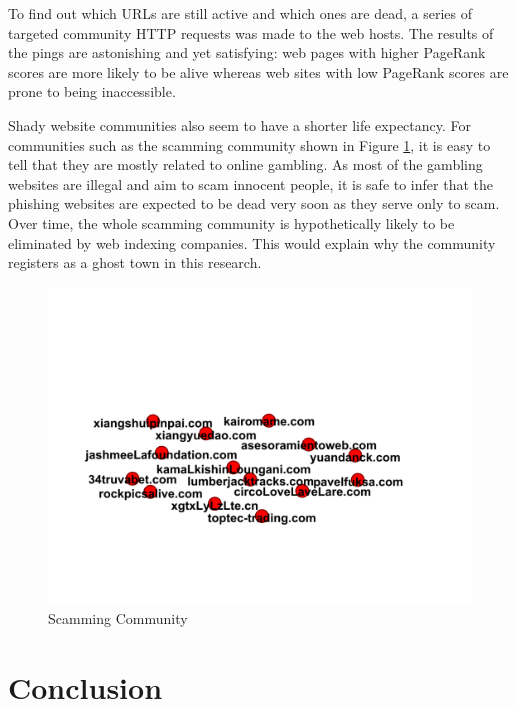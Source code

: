 \documentclass[conference]{IEEEtran}
\begin{document}
To find out which URLs are still active and which ones are dead, a series of targeted community HTTP requests was made to the web hosts. The results of the pings are astonishing and yet satisfying: web pages with higher PageRank scores\cite{ilprints422} are more likely to be alive whereas web sites with low PageRank scores are prone to being inaccessible.

Shady website communities also seem to have a shorter life expectancy. For communities such as the scamming community shown in Figure \ref{fig:dead}, it is easy to tell that they are mostly related to online gambling. As most of the gambling websites are illegal and aim to scam innocent people, it is safe to infer that the phishing websites are expected to be dead very soon as they serve only to scam. Over time, the whole scamming community is hypothetically likely to be eliminated by web indexing companies. This would explain why the community registers as a ghost town in this research.

\begin{figure}[!h]
 \centerline{\includegraphics[width=\columnwidth]{figs/07after.png}}
 \caption{Scamming Community} 
 \label{fig:dead}
\end{figure}

\section{Conclusion}





\end{document}
